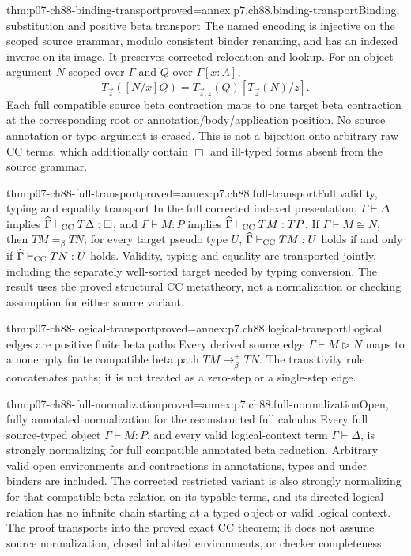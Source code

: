\begin{hblemma}{thm:p07-ch88-binding-transport}{proved=annex:p7.ch88.binding-transport}{Binding, substitution and positive beta transport}
The named encoding is injective on the scoped source grammar, modulo
consistent binder renaming, and has an indexed inverse on its image.
It preserves corrected relocation and lookup. For an object argument
\(N\) scoped over \(\Gamma\) and \(Q\) over \(\Gamma[x:A]\),
\[
 T_{\vec z}([N/x]Q)
   =T_{\vec z,z}(Q)[T_{\vec z}(N)/z].
\]
Each full compatible source beta contraction maps to one target beta
contraction at the corresponding root or annotation/body/application
position. No source annotation or type argument is erased.
This is not a bijection onto arbitrary raw CC terms, which additionally
contain \(\Box\) and ill-typed forms absent from the source grammar.
\end{hblemma}

\begin{hbtheorem}{thm:p07-ch88-full-transport}{proved=annex:p7.ch88.full-transport}{Full validity, typing and equality transport}
In the full corrected indexed presentation,
\(\Gamma\vdash\Delta\) implies
\(\widehat\Gamma\vdash_{\rm CC}T\Delta:\Box\), and
\(\Gamma\vdash M:P\) implies
\(\widehat\Gamma\vdash_{\rm CC}TM:TP\).
If \(\Gamma\vdash M\cong N\), then \(TM=_\beta TN\);
for every target pseudo type \(U\),
\(\widehat\Gamma\vdash_{\rm CC}TM:U\) holds if and only if
\(\widehat\Gamma\vdash_{\rm CC}TN:U\) holds.
Validity, typing and equality are transported jointly, including the
separately well-sorted target needed by typing conversion. The result
uses the proved structural CC metatheory, not a normalization or checking
assumption for either source variant.
\end{hbtheorem}

\begin{hblemma}{thm:p07-ch88-logical-transport}{proved=annex:p7.ch88.logical-transport}{Logical edges are positive finite beta paths}
Every derived source edge
\(\Gamma\vdash M\mathrel{\triangleright}N\) maps to a nonempty
finite compatible beta path \(TM\longrightarrow_\beta^+TN\).
The transitivity rule concatenates paths; it is not treated as a
zero-step or a single-step edge.
\end{hblemma}

\begin{hbtheorem}{thm:p07-ch88-full-normalization}{proved=annex:p7.ch88.full-normalization}{Open, fully annotated normalization for the reconstructed full calculus}
\label{thm:p07-coc-strong-normalization}
Every full source-typed object \(\Gamma\vdash M:P\), and every
valid logical-context term \(\Gamma\vdash\Delta\), is strongly
normalizing for full compatible annotated beta reduction. Arbitrary
valid open environments and contractions in annotations, types and
under binders are included. The corrected restricted variant is also
strongly normalizing for that compatible beta relation on its typable
terms, and its directed logical relation has no infinite chain starting
at a typed object or valid logical context. The proof transports into
the proved exact CC theorem; it does not assume source normalization,
closed inhabited environments, or checker completeness.
\end{hbtheorem}

